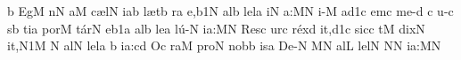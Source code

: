 


\smallskip

\Internote
\nosolesmescustos
\initiumgregorianum
\znotes\fissum{1pt}\bmolle b\en
{}%
\sgn {}E{g}\punctum M\egn
\sgn {}{\'\i}n\punctum N\egn
\sgn {}a{}\punctum M\egn
\spatium
\begingroup
\bgenerale
\sgn c{\ae}l\punctum N\egn
\sgn {}i{}\punctum a\augmentum b\egn
\spatium
\asteriscus
\spatium
\sgn l{\ae}t\punctum b\egn
{}r\punctum a\egn
\sgn {}e,\episem b1\punctum N\egn
\spatium
\spatium
\sgn {}al\punctum b\egn
\sgn lel\punctum a\egn
{}i\punctum N\egn
\sgn {}a:\punctum M\augmentum N\egn
\spatium
\divisiominor
\spatium
i{-}\punctum M\egn
\sgn {}a{}\episem d1\punctum c\egn
\spatium
{}em\punctum c\egn
\spatium
\sgn m{e}-\punctum d\egn
\custos c
\lineaproxima
{}u{-}\punctum c\egn
\sgn {}{\'\i}s\punctum b\egn
\sgn t{i}{}\punctum a\egn
\spatium
\sgn por\punctum M\egn
\sgn t{\'a}r\punctum N\egn
\sgn {}e{}\episem b1\punctum a\egn
\spatium
\sgn {}al\punctum b\egn
\sgn le{}\punctum a\egn
\sgn l{\'u}{-}\punctum N\egn
\sgn ia:\punctum M\augmentum N\egn
\spatium
\divisiominor
\spatium
\sgn Res\punctum c\egn
\sgn {}ur\punctum c\egn
\sgn r{\'e}x\punctum d\egn
\sgn {}i{t,}\episem d1\punctum c\egn
\spatium
\sgn sic\punctum c\egn
{}t\punctum M\egn
\spatium
\sgn dix\punctum N\egn
\sgn {}i{t,}\episem N1\punctum M\egn
\spatium
\custos N
\lineaproxima
\sgn {}al\punctum N\egn
\sgn lel\punctum a\egn
{}\punctum b\egn
\sgn ia:\punctum c\augmentum d\egn
\spatium
\divisiomaior
\spatium
\sgn {}O{}\punctum c\egn
\sgn ra{}\punctum M\egn
\spatium
\sgn pro\punctum N\egn
\spatium
\sgn n{o}b\punctum b\egn
\sgn {}is\punctum a\egn
\spatium
\sgn D{e}{-}\punctum N\egn
{}\punctum M\augmentum N\egn
\spatium
\sgn {}al\punctum L\egn
\sgn lel\punctum N\egn
{}\punctum N\spatiumparvum\punctum N\egn
\sgn ia:\punctum M\augmentum N\egn
\spatium
\endgroup
\Finisgregoriana

